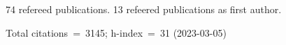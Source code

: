 74 refereed publications. 13 refeered publications as first author.

Total citations~=~3145; h-index~=~31 (2023-03-05)